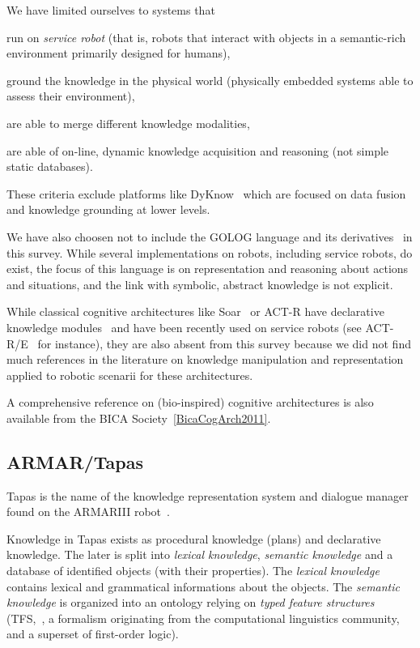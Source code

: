 We have limited ourselves to systems that
\begin{inparaenum} 
    \item  run on \emph{service robot} (that is, robots that interact with 
    objects in a semantic-rich environment primarily designed for humans),
    \item  ground the knowledge in the physical world (physically embedded
    systems able to assess their environment),
    \item  are able to merge different knowledge modalities,
    \item  are able of on-line, dynamic knowledge acquisition and reasoning 
    (\ie not simple static databases).
\end{inparaenum}

These criteria exclude platforms like {\sc DyKnow}~\cite{Heintz2004}
which are focused on data fusion and knowledge grounding at lower levels.

We have also choosen not to include the GOLOG language and its
derivatives~\cite{Levesque1997, Ferrein2008, Gspandl2011} in this survey. While
several implementations on robots, including service robots, do exist, the
focus of this language is on representation and reasoning about actions and
situations, and the link with symbolic, abstract knowledge is not explicit.

While classical cognitive architectures like {\sc Soar}~\cite{Lehman2006} or
{\sc ACT-R} have declarative knowledge modules~\cite{Derbinsky2010} and have
been recently used on service robots (see {\sc ACT-R/E}~\cite{Kennedy2009} for
instance), they are also absent from this survey because we did not find much
references in the literature on knowledge manipulation and representation
applied to robotic scenarii for these architectures.

A comprehensive reference on (bio-inspired) cognitive architectures is also
available from the BICA Society~\ref{BicaCogArch2011}.

\subsection{ARMAR/Tapas}

{\sc Tapas} is the name of the knowledge representation system and dialogue
manager found on the ARMARIII robot~\cite{Holzapfel2008}.

Knowledge in {\sc Tapas} exists as procedural knowledge (plans) and declarative
knowledge. The later is split into \emph{lexical knowledge}, \emph{semantic
knowledge} and a database of identified objects (with their properties). The
\emph{lexical knowledge} contains lexical and grammatical informations about
the objects. The \emph{semantic knowledge} is organized into an ontology
relying on \emph{typed feature structures} (TFS,~\cite{Carpenter1992}, a
formalism originating from the computational linguistics community, and a
superset of first-order logic).


